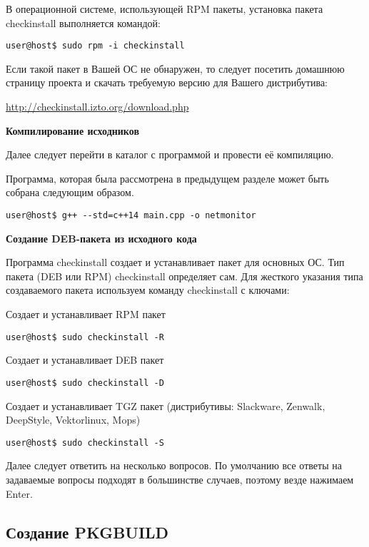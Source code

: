 В операционной системе, использующей RPM пакеты, установка пакета checkinstall выполняется командой:

\begin{Verbatim}[frame=single]
user@host$ sudo rpm -i checkinstall
\end{Verbatim}

Если такой пакет в Вашей ОС не обнаружен, то следует посетить домашнюю страницу проекта и скачать требуемую версию для Вашего дистрибутива:

\url{http://checkinstall.izto.org/download.php}

\textbf{Компилирование исходников}

Далее следует перейти в каталог с программой и провести её компиляцию.

Программа, которая была рассмотрена в предыдущем разделе может быть собрана следующим образом.

\begin{Verbatim}[frame=single]
user@host$ g++ --std=c++14 main.cpp -o netmonitor
\end{Verbatim}

\textbf{Создание DEB-пакета из исходного кода}

Программа checkinstall создает и устанавливает пакет для основных ОС. Тип пакета (DEB или RPM) checkinstall определяет сам. Для жесткого указания типа создаваемого пакета используем команду checkinstall с ключами:

Создает и устанавливает RPM пакет

\begin{Verbatim}[frame=single]
user@host$ sudo checkinstall -R
\end{Verbatim}

Создает и устанавливает DEB пакет
\begin{Verbatim}[frame=single]
user@host$ sudo checkinstall -D
\end{Verbatim}

Создает и устанавливает TGZ пакет (дистрибутивы: Slackware, Zenwalk, DeepStyle, Vektorlinux, Mops)
\begin{Verbatim}[frame=single]
user@host$ sudo checkinstall -S
\end{Verbatim}

Далее следует ответить на несколько вопросов. По умолчанию все ответы на задаваемые вопросы подходят в большинстве случаев, поэтому везде нажимаем Enter.

\subsection{Создание PKGBUILD}

